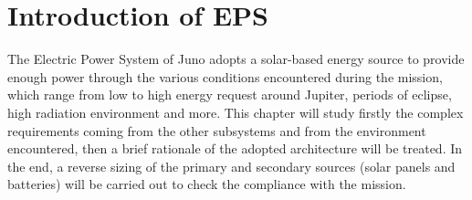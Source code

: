 \section{Introduction of EPS}
\label{sec:EPS_introduction}

The Electric Power System of Juno adopts a solar-based energy source to provide enough power through the various conditions encountered during the mission, which range from low to high energy request around Jupiter, periods of eclipse, high radiation environment and more.
This chapter will study firstly the complex requirements coming from the other subsystems and from the environment encountered, then a brief rationale of the adopted architecture will be treated.
In the end, a reverse sizing of the primary and secondary sources (solar panels and batteries) will be carried out to check the compliance with the mission.